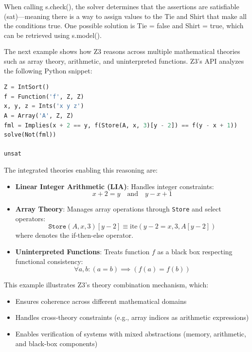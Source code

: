 \documentclass[]{rptuseminar}
\begin{document}
When calling s.check(), the solver determines that the assertions are satisfiable
 (sat)—meaning there is a way to assign values to the Tie and Shirt that make all the 
conditions true. One possible solution is Tie = false and Shirt = true, which can be retrieved using s.model().
\vspace{1em}



The next example shows how Z3 reasons across multiple mathematical theories such as array theory, arithmetic, and uninterpreted functions. Z3's API analyzes the following Python snippet:


\begin{lstlisting}[language=Python]
Z = IntSort()
f = Function('f', Z, Z)
x, y, z = Ints('x y z')
A = Array('A', Z, Z)
fml = Implies(x + 2 == y, f(Store(A, x, 3)[y - 2]) == f(y - x + 1))
solve(Not(fml))

unsat
\end{lstlisting}

\vspace{1em}


The integrated theories enabling this reasoning are:

\begin{itemize}
    \item \textbf{Linear Integer Arithmetic (LIA)}: Handles integer constraints:
    \begin{equation*}
        x + 2 = y \quad \text{and} \quad y - x + 1
    \end{equation*}
    
    \item \textbf{Array Theory}: Manages array operations through \texttt{Store} and select operators:
    \begin{equation*}
        \texttt{Store}(A, x, 3)[y - 2] \equiv \text{ite}(y - 2 = x, 3, A[y - 2])
    \end{equation*}
    where  denotes the if-then-else operator.
    
    \item \textbf{Uninterpreted Functions}: Treats function $f$ as a black box respecting functional consistency:
    \begin{equation*}
        \forall a, b: (a = b) \implies (f(a) = f(b))
    \end{equation*}
\end{itemize}

This example illustrates Z3's theory combination mechanism, which:
\begin{itemize}
    \item Ensures coherence across different mathematical domains
    \item Handles cross-theory constraints (e.g., array indices as arithmetic expressions)
    \item Enables verification of systems with mixed abstractions (memory, arithmetic, and black-box components)
\end{itemize}
\end{document}

